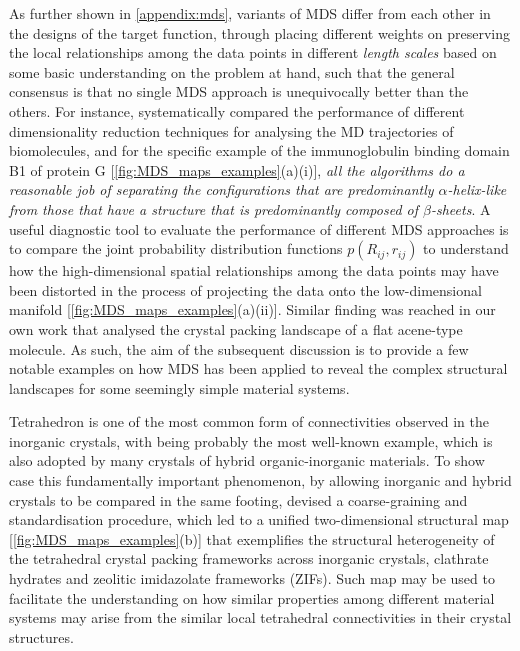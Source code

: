 As further shown in \cref{appendix:mds},  variants of MDS differ from each other in the designs of the target function, through placing different weights on preserving the local relationships among the data points in different \textit{length scales} based on some basic understanding on the problem at hand, such that the general consensus is that no single MDS approach is unequivocally better than the others.\cite{duan2013evaluation} For instance, \citet{tribello2019using} systematically compared the performance of different dimensionality reduction techniques for analysing the MD trajectories of biomolecules, and for the specific example of the immunoglobulin binding domain B1 of protein G [\cref{fig:MDS_maps_examples}(a)(i)], \emph{all the algorithms do a reasonable job of separating the configurations that are predominantly $\alpha$-helix-like from those that have a structure that is predominantly composed of $\beta$-sheets}. A useful diagnostic tool to evaluate the performance of different MDS approaches is to compare the joint probability distribution functions $p(R_{ij},r_{ij})$ to understand how the high-dimensional spatial relationships among the data points may have been distorted in the process of projecting the data onto the low-dimensional manifold [\cref{fig:MDS_maps_examples}(a)(ii)]. Similar finding was reached in our own work that analysed the crystal packing landscape of a flat acene-type molecule.\cite{yang2019interplay} As such, the aim of the subsequent discussion is to provide a few notable examples on how MDS has been applied to reveal the complex structural landscapes for some seemingly simple material systems.

Tetrahedron is one of the most common form of connectivities observed in the inorganic crystals, with  being probably the most well-known example, which is also adopted by many crystals of hybrid organic-inorganic materials. To show case this fundamentally important phenomenon, by allowing inorganic and hybrid crystals to be compared in the same footing, \citet{nicholas2020understanding} devised a coarse-graining and standardisation procedure, which led to a unified two-dimensional structural map [\cref{fig:MDS_maps_examples}(b)] that exemplifies the structural heterogeneity of the tetrahedral crystal packing frameworks across inorganic crystals, clathrate hydrates and zeolitic imidazolate frameworks (ZIFs). Such map may be used to facilitate the understanding on how similar properties among different material systems may arise from the similar local tetrahedral connectivities in their crystal structures.


